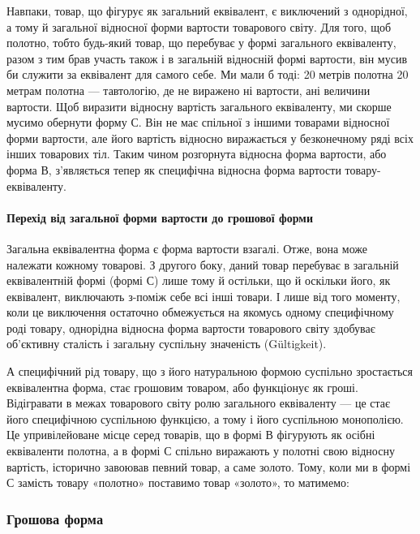 Навпаки, товар, що фігурує як загальний еквівалент, є виключений
з однорідної, а тому й загальної відносної форми вартости
товарового світу. Для того, щоб полотно, тобто будь-який
товар, що перебуває у формі загального еквіваленту, разом з тим
брав участь також і в загальній відносній формі вартости, він
мусив би служити за еквівалент для самого себе. Ми мали б тоді:
20 метрів полотна \deq{} 20 метрам полотна — тавтологію, де не виражено
ні вартости, ані величини вартости. Щоб виразити відносну
вартість загального еквіваленту, ми скорше мусимо обернути
форму $С$. Він не має спільної з іншими товарами відносної
форми вартости, але його вартість відносно виражається у безконечному
ряді всіх інших товарових тіл. Таким чином розгорнута
відносна форма вартости, або форма $В$, з’являється тепер
як специфічна відносна форма вартости товару-еквіваленту.

\paragraph{Перехід від загальної форми вартости до грошової форми}

Загальна еквівалентна форма є форма вартости взагалі. Отже,
вона може належати кожному товарові. З другого боку, даний
товар перебуває в загальній еквівалентній формі (формі $С$) лише
тому й остільки, що й оскільки його, як еквівалент, виключають
з-поміж себе всі інші товари. І лише від того моменту, коли це
виключення остаточно обмежується на якомусь одному специфічному
роді товару, однорідна відносна форма вартости товарового
світу здобуває об’єктивну сталість і загальну суспільну значеність
(Gültigkeit).

А специфічний рід товару, що з його натуральною формою
суспільно зростається еквівалентна форма, стає грошовим товаром,
або функціонує як гроші. Відігравати в межах товарового
світу ролю загального еквіваленту — це стає його специфічною
суспільною функцією, а тому і його суспільною монополією. Це
упривілейоване місце серед товарів, що в формі $В$ фігурують як
осібні еквіваленти полотна, а в формі $С$ спільно виражають у
полотні свою відносну вартість, історично завоював певний товар,
а саме золото. Тому, коли ми в формі $С$ замість товару
«полотно» поставимо товар «золото», то матимемо:

\subsubsection{Грошова форма}

